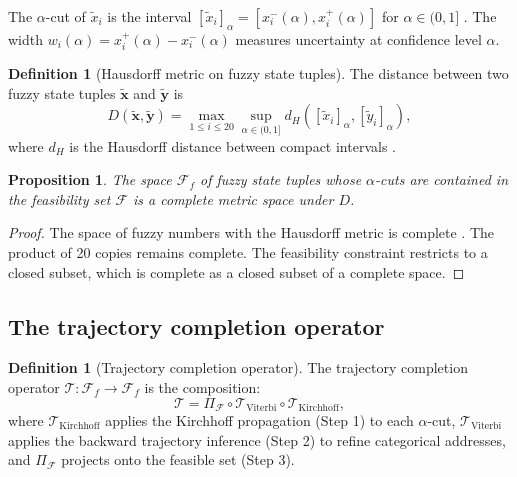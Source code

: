 \documentclass[twocolumn,10pt,a4paper]{article}
\newtheorem{proposition}[theorem]{Proposition}
\theoremstyle{definition}
\newtheorem{definition}[theorem]{Definition}
\theoremstyle{remark}
\newcommand{\Fcal}{\mathcal{F}}
\newcommand{\Tcal}{\mathcal{T}}
\newcommand{\vect}[1]{\boldsymbol{#1}}
\newcommand{\fuzzy}[1]{\widetilde{#1}}
\begin{document}
The $\alpha$-cut of $\fuzzy{x}_i$ is the interval $[\fuzzy{x}_i]_\alpha = [x_i^-(\alpha), x_i^+(\alpha)]$ for $\alpha \in (0, 1]$ \citep{Zadeh1965, Klir1995}. The width $w_i(\alpha) = x_i^+(\alpha) - x_i^-(\alpha)$ measures uncertainty at confidence level $\alpha$.

\begin{definition}[Hausdorff metric on fuzzy state tuples]\label{def:hausdorff_fuzzy}
The distance between two fuzzy state tuples $\fuzzy{\vect{x}}$ and $\fuzzy{\vect{y}}$ is
\begin{equation}\label{eq:hausdorff_fuzzy}
    D(\fuzzy{\vect{x}}, \fuzzy{\vect{y}}) = \max_{1 \leq i \leq 20} \sup_{\alpha \in (0,1]} d_H([\fuzzy{x}_i]_\alpha, [\fuzzy{y}_i]_\alpha),
\end{equation}
where $d_H$ is the Hausdorff distance between compact intervals \citep{Diamond1994, Hausdorff1914}.
\end{definition}

\begin{proposition}\label{prop:complete_metric}
The space $\Fcal_f$ of fuzzy state tuples whose $\alpha$-cuts are contained in the feasibility set $\Fcal$ is a complete metric space under $D$.
\end{proposition}

\begin{proof}
The space of fuzzy numbers with the Hausdorff metric is complete \citep{Diamond1994}. The product of 20 copies remains complete. The feasibility constraint restricts to a closed subset, which is complete as a closed subset of a complete space.
\end{proof}

\subsection{The trajectory completion operator}

\begin{definition}[Trajectory completion operator]\label{def:tc_operator}
The trajectory completion operator $\Tcal : \Fcal_f \to \Fcal_f$ is the composition:
\begin{equation}\label{eq:tc_operator}
    \Tcal = \Pi_{\Fcal} \circ \Tcal_{\mathrm{Viterbi}} \circ \Tcal_{\mathrm{Kirchhoff}},
\end{equation}
where $\Tcal_{\mathrm{Kirchhoff}}$ applies the Kirchhoff propagation (Step 1) to each $\alpha$-cut, $\Tcal_{\mathrm{Viterbi}}$ applies the backward trajectory inference (Step 2) to refine categorical addresses, and $\Pi_{\Fcal}$ projects onto the feasible set (Step 3).
\end{definition}
\end{document}
